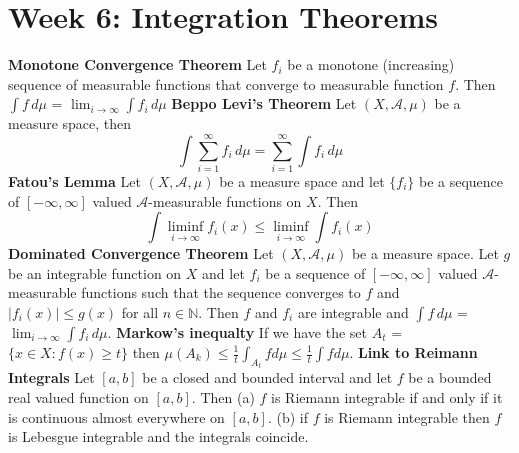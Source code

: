 \documentclass{article}
\begin{document}
\section{Week 6: Integration Theorems}
\textbf{Monotone Convergence Theorem} Let $f_i$ be a monotone (increasing) sequence of measurable functions that converge to measurable function $f$. Then $\int f \,d\mu$ = $\lim_{i\to\infty} \int f_i \,d\mu$
\newline \newline \textbf{Beppo Levi's Theorem} Let $(X, \mathcal{A}, \mu)$ be a measure space, then \[ \int \sum\limits_{i=1}^{\infty}f_i \,d\mu = \sum\limits_{i=1}^{\infty} \int f_i \,d\mu \]
\newline \newline \textbf{Fatou's Lemma} Let $(X, \mathcal{A}, \mu)$ be a measure space and let $\{ f_i \}$ be a sequence of $[-\infty, \infty]$ valued $\mathcal{A}$-measurable functions on $X$. Then \[ \int \liminf_{i\to\infty} f_i(x) \leq  \liminf_{i\to\infty} \int f_i(x)\]
\newline \newline \textbf{Dominated Convergence Theorem} Let $(X, \mathcal{A}, \mu)$ be a measure space. Let $g$ be an integrable function on $X$ and let $f_i$ be a sequence of $[-\infty, \infty]$ valued $\mathcal{A}$-measurable functions such that the sequence converges to $f$ and $|f_i(x)| \leq g(x)$ for all $n \in \mathbb{N}$. Then $f$ and $f_i$ are integrable and $\int f \,d\mu$ = $\lim_{i\to\infty} \int f_i \,d\mu$.
\newline \newline \textbf{Markow's inequalty} If we have the set $A_t$ = $\{ x \in X : f(x) \geq t \}$ then $\mu(A_k) \leq \frac{1}{t} \int_{A_t} f d\mu \leq \frac{1}{t} \int f d\mu$.
\newline \newline \textbf{Link to Reimann Integrals} Let $[a,b]$ be a closed and bounded interval and let $f$ be a bounded real valued function on $[a,b]$. Then
\newline (a) $f$ is Riemann integrable if and only if it is continuous almost everywhere on $[a,b]$.
\newline (b) if $f$ is Riemann integrable then $f$ is Lebesgue integrable and the integrals coincide.
\end{document}
